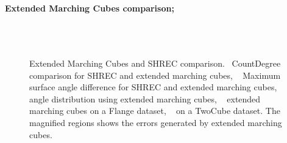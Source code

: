 \paragraph{Extended Marching Cubes comparison;}
\begin{figure}
	\centering
	\\
	\\
	\caption{Extended Marching Cubes and SHREC comparison.~\protect{} CountDegree comparison for SHREC and extended marching cubes, 
		~\protect{} Maximum surface angle difference for SHREC and extended marching cubes, 
		~\protect{} angle distribution  using extended marching cubes, 
		~\protect{} extended marching cubes on a Flange dataset, ~\protect{} on a TwoCube dataset. The magnified regions shows the errors generated by extended marching cubes.}	
\end{figure}

